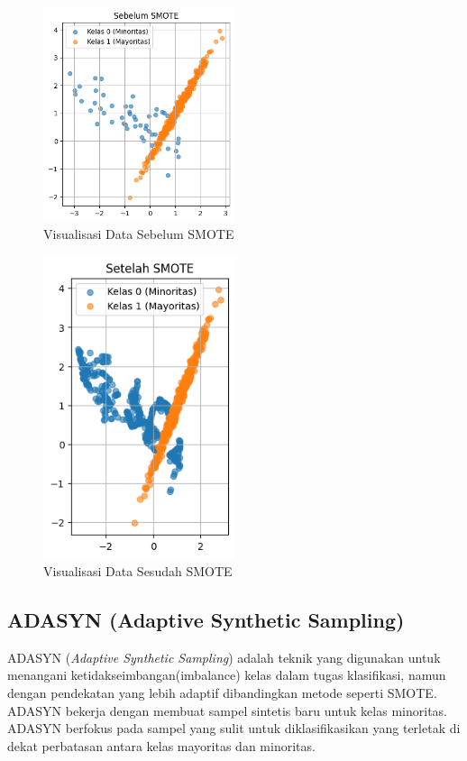 \begin{figure}[H]
	\centering
	\includegraphics[width=0.5\textwidth]{figure/visualisasi_data_sebelum_smote.png}
	\caption{Visualisasi Data Sebelum SMOTE}
	\label{fig:2.visualisasidatasebelumsmote}
\end{figure}

\begin{figure}[H]
	\centering
	\includegraphics[width=0.5\textwidth]{figure/visualisasi_data_sesudah_smote.png}
	\caption{Visualisasi Data Sesudah SMOTE}
	\label{fig:2.visualisasidatasesudahsmote}
\end{figure}

\subsection{ADASYN (Adaptive Synthetic Sampling)} \label{II.adasyn}
ADASYN (\textit{Adaptive Synthetic Sampling}) adalah teknik yang digunakan untuk menangani ketidakseimbangan(imbalance) kelas dalam tugas klasifikasi, namun dengan pendekatan yang lebih adaptif dibandingkan metode seperti SMOTE\cite{4633969}. ADASYN bekerja dengan membuat sampel sintetis baru untuk kelas minoritas. ADASYN berfokus pada sampel yang sulit untuk diklasifikasikan yang terletak di dekat perbatasan antara kelas mayoritas dan minoritas\cite{4633969}.
